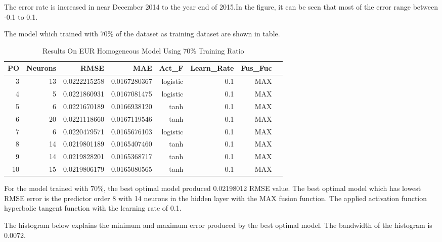 {{{{{{{{{	
\pagebreak
The error rate is increased in near December 2014 to the year end of 2015.In the figure, it can be seen that most of the error range between -0.1 to 0.1. 

	
The model which trained with 70\% of the dataset as training dataset are shown in table.

\setlength{\tabcolsep}{0.5em} %
{\renewcommand{\arraystretch}{1.2}
		
	\begin{table}[ht]
			\centering
			\begin{tabular}{@{}rrrrrrrr@{}}
				\toprule
				\textbf{PO}&\textbf{Neurons}& \textbf{RMSE} & \textbf{MAE} & \textbf{Act\_F}  & \textbf{Learn\_Rate} &\textbf{ Fus\_Fuc}\\ 
				\midrule
			 3 & 13 & 0.0222215258 & 0.0167280367 & logistic & 0.1 & MAX \\ 
			 4 & 5 & 0.0221860931 & 0.0167081475 & logistic & 0.1 & MAX \\ 
			 5 & 6 & 0.0221670189 & 0.0166938120 & tanh & 0.1 & MAX \\ 
			 6 & 20 & 0.0221118660 & 0.0167119546 & tanh & 0.1 & MAX \\ 
			 7 & 6 & 0.0220479571 & 0.0165676103 & logistic & 0.1 & MAX \\ 
			 8 & 14 & 0.0219801189 & 0.0165407460 & tanh & 0.1 & MAX \\ 
			 9 & 14 & 0.0219828201 & 0.0165368717 & tanh & 0.1 & MAX \\ 
			 10 & 15 & 0.0219806179 & 0.0165080565 & tanh & 0.1& MAX \\ 
			\hline 
				
	\end{tabular}
			\hspace*{1cm}
			\caption{Results On EUR Homogeneous Model Using 70\% Training Ratio }
		\end{table}
		 		
For the model trained with 70\%,  the best optimal model produced 0.02198012 RMSE value. The best optimal model which has lowest RMSE error is the predictor order 8 with 14 neurons in the hidden layer with the MAX fusion function. The applied activation function hyperbolic tangent function with the learning rate of 0.1.
		
The histogram below explains the minimum and maximum error produced by the best optimal model. The bandwidth of the histogram is 0.0072.
		
}}}}}}}}}}
